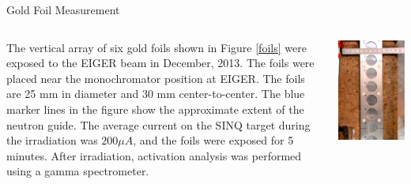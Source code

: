 \documentclass[final,t]{beamer}
\begin{document}
\begin{frame}{}
\begin{columns}[t]
\begin{column}{.3\linewidth}
      \begin{block}{Gold Foil Measurement}
        \begin{columns}[T]
          \begin{column}{.75\linewidth}
            The vertical array of six gold foils shown in Figure \ref{foils} were exposed to the EIGER beam in December, 2013.   The foils were placed near the monochromator position at EIGER.  The foils are 25 mm in diameter and 30 mm center-to-center.  The blue marker lines in the figure show the approximate extent of the neutron guide.  The average current on the SINQ target during the irradiation was $200 \mu A$, and the foils were exposed for 5 minutes.  After irradiation, activation analysis was performed using a gamma spectrometer.
          \end{column}
          \begin{column}{.25\linewidth}
            \includegraphics*[width=\linewidth]{foils.eps}
          \end{column}
        \end{columns}
      \end{block}


\end{column}
\end{columns}
\end{frame}
\end{document}
